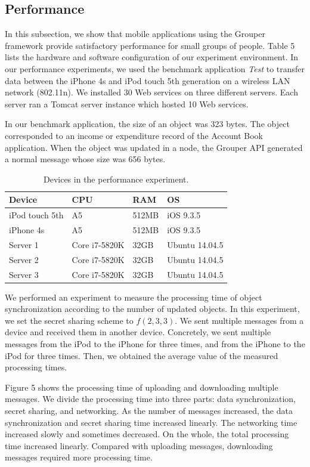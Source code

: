 \documentclass{sig-alternate-05-2015}
\begin{document}
\subsection{Performance}

In this subsection, we show that mobile applications using the Grouper framework provide satisfactory performance for small groups of people.
Table 5 lists the hardware and software configuration of our experiment environment.
In our performance experiments, we used the benchmark application \emph{Test} to transfer data between the iPhone 4s and iPod touch 5th generation on a wireless LAN network (802.11n).
We installed 30 Web services on three different servers.
Each server ran a Tomcat server instance which hosted 10 Web services.

In our benchmark application, the size of an object was 323 bytes.
The object corresponded to an income or expenditure record of the Account Book application.
When the object was updated in a node, the Grouper API generated a normal message whose size was 656 bytes.

\begin{table}[t]
	\centering  
	\caption{Devices in the performance experiment.}
	\begin{tabular}{llll}
		\hline
		\textbf{Device} & \textbf{CPU} & \textbf{RAM} & \textbf{OS} \\ \hline
		iPod touch 5th & A5 & 512MB & iOS 9.3.5 \\
		iPhone 4s & A5 & 512MB & iOS 9.3.5 \\
		Server 1 & Core i7-5820K & 32GB & Ubuntu 14.04.5 \\
		Server 2 & Core i7-5820K & 32GB & Ubuntu 14.04.5 \\
		Server 3 & Core i7-5820K & 32GB & Ubuntu 14.04.5 \\ \hline
	\end{tabular}
\end{table}

We performed an experiment to measure the processing time of object synchronization according to the number of updated objects.
In this experiment, we set the secret sharing scheme to ${f(2, 3, 3)}$.
We sent multiple messages from a device and received them in another device. 
Concretely, we sent multiple messages from the iPod to the iPhone for three times, and from the iPhone to the iPod for three times.
Then, we obtained the average value of the measured processing times.

Figure 5 shows the processing time of uploading and downloading multiple messages.
We divide the processing time into three parts: data synchronization, secret sharing, and networking.
As the number of messages increased, the data synchronization and secret sharing time increased linearly. 
The networking time increased slowly and sometimes decreased.
On the whole, the total processing time increased linearly.
Compared with uploading messages, downloading messages required more processing time.
\end{document}
